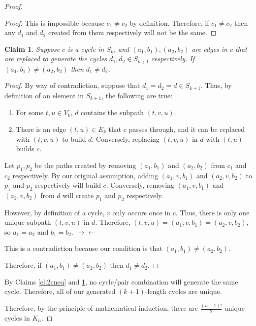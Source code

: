 \documentclass{article}
\newcommand{\contradiction}{$\rightarrow\leftarrow$}
\newtheorem{claim}{Claim}
\begin{document}
\begin{outline}[enumerate]
\begin{proof}
\begin{adjustwidth}{0.5cm}{0cm}
\begin{proof}
                This is impossible because $c_1 \neq c_2$ by definition. Therefore, if $c_1 \neq c_2$ then any $d_1$ and $d_2$ created from them respectively will not be the same.
            \end{proof}
        \end{adjustwidth}

        \begin{claim}
            Suppose $c$ is a cycle in $S_k$, and $(a_1, b_1), (a_2, b_2)$ are edges in $c$ that are replaced to generate the cycles $d_1, d_2 \in S_{k+1}$ respectively. If $(a_1, b_1) \neq (a_2, b_2)$ then $d_1 \neq d_2$.
            \label{cl:2eneq}
        \end{claim}
        \begin{adjustwidth}{0.5cm}{0cm}

            \begin{proof}
                By way of contradiction, suppose that $d_1 = d_2 = d \in S_{k+1}$. Thus, by definition of an element in $S_{k+1}$, the following are true:
                \begin{enumerate}
                    \item For some $t, u \in V_k$, $d$ contains the subpath $(t, v, u)$.
                    \item There is an edge $(t, u) \in E_k$ that $c$ passes through, and it can be replaced with $(t, v, u)$ to build $d$. Conversely, replacing $(t, v, u)$ in $d$ with $(t, u)$ builds $c$.
                \end{enumerate}

                Let $p_1, p_2$ be the paths created by removing $(a_1, b_1)$ and $(a_2, b_2)$ from $c_1$ and $c_2$ respectively. By our original assumption, adding $(a_1, v, b_1)$ and $(a_2, v, b_2)$ to $p_1$ and $p_2$ respectively will build $c$. Conversely, removing $(a_1, v, b_1)$ and $(a_2, v, b_2)$ from $d$ will create $p_1$ and $p_2$ respectively.

                However, by definition of a cycle, $v$ only occurs once in $c$. Thus, there is only one unique subpath $(t, v, u)$ in $d$. Therefore, $(t, v, u) = (a_1, v, b_1) = (a_2, v, b_2)$, so $a_1 = a_2$ and $b_1 = b_2$. \contradiction

                This is a contradiction because our condition is that $(a_1, b_1) \neq (a_2, b_2)$.

                Therefore, if $(a_1, b_1) \neq (a_2, b_2)$ then $d_1 \neq d_2$.
            \end{proof}
        \end{adjustwidth}

        By Claims \ref{cl:2cneq} and \ref{cl:2eneq}, no cycle/pair combination will generate the same cycle. Therefore, all of our generated $(k+1)$-length cycles are unique.

        Therefore, by the principle of mathematical induction, there are $\frac{(n-1)!}{2}$ unique cycles in $K_n$.
    \end{proof}
\end{outline}
\end{document}

